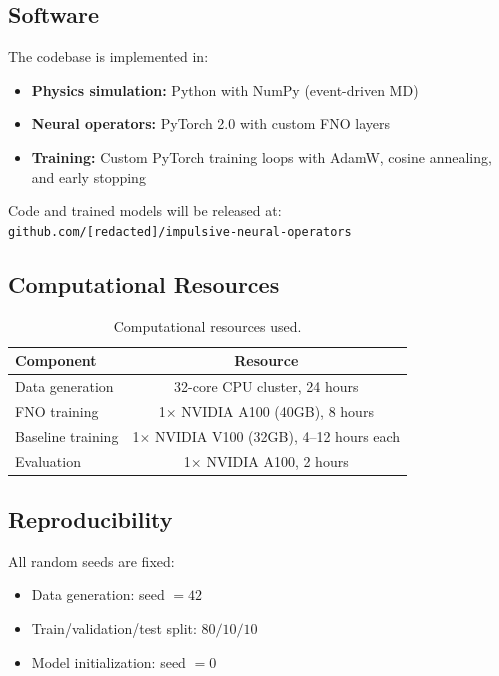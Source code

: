 \documentclass[11pt]{article}
\begin{document}
\subsection{Software}

The codebase is implemented in:
\begin{itemize}
    \item \textbf{Physics simulation:} Python with NumPy (event-driven MD)
    \item \textbf{Neural operators:} PyTorch 2.0 with custom FNO layers
    \item \textbf{Training:} Custom PyTorch training loops with AdamW, cosine annealing, and early stopping
\end{itemize}

Code and trained models will be released at: \texttt{github.com/[redacted]/impulsive-neural-operators}

\subsection{Computational Resources}

\begin{table}[h]
\centering
\begin{tabular}{lc}
\toprule
\textbf{Component} & \textbf{Resource} \\
\midrule
Data generation & 32-core CPU cluster, 24 hours \\
FNO training & 1$\times$ NVIDIA A100 (40GB), 8 hours \\
Baseline training & 1$\times$ NVIDIA V100 (32GB), 4--12 hours each \\
Evaluation & 1$\times$ NVIDIA A100, 2 hours \\
\bottomrule
\end{tabular}
\caption{Computational resources used.}
\end{table}

\subsection{Reproducibility}

All random seeds are fixed:
\begin{itemize}
    \item Data generation: seed $= 42$
    \item Train/validation/test split: $80/10/10$
    \item Model initialization: seed $= 0$
\end{itemize}
\end{document}
